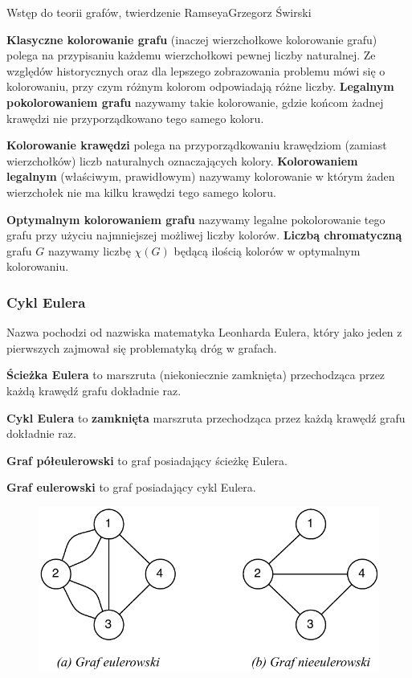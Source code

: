 \begin{referat}{Wstęp do teorii grafów, twierdzenie Ramseya}{Grzegorz Świrski}
\begin{teoria}
\textbf{Klasyczne kolorowanie grafu} (inaczej wierzchołkowe kolorowanie grafu) polega na przypisaniu każdemu wierzchołkowi pewnej liczby naturalnej. Ze względów historycznych oraz dla lepszego zobrazowania problemu mówi się o kolorowaniu, przy czym różnym kolorom odpowiadają różne liczby. \textbf{Legalnym pokolorowaniem grafu} nazywamy takie kolorowanie, gdzie końcom żadnej krawędzi nie przyporządkowano tego samego koloru.

\textbf{Kolorowanie krawędzi} polega na przyporządkowaniu krawędziom (zamiast wierzchołków) liczb naturalnych oznaczających kolory. \textbf{Kolorowaniem legalnym} (właściwym, prawidłowym) nazywamy kolorowanie w którym żaden wierzchołek nie ma kilku krawędzi tego samego koloru.

\textbf{Optymalnym kolorowaniem grafu} nazywamy legalne pokolorowanie tego grafu przy użyciu najmniejszej możliwej liczby kolorów. \textbf{Liczbą chromatyczną} grafu $G$ nazywamy liczbę $\chi(G)$ będącą ilością kolorów w optymalnym kolorowaniu.

\subsubsection{Cykl Eulera}
Nazwa pochodzi od nazwiska matematyka Leonharda Eulera, który jako jeden z pierwszych zajmował się problematyką dróg w grafach. 

\textbf{Ścieżka Eulera} to marszruta (niekoniecznie zamknięta) przechodząca przez każdą krawędź grafu dokładnie raz.

\textbf{Cykl Eulera} to \textbf{zamknięta} marszruta przechodząca przez każdą krawędź grafu dokładnie raz.

\textbf{Graf półeulerowski} to graf posiadający ścieżkę Eulera.

\textbf{Graf eulerowski} to graf posiadający cykl Eulera.

\begin{figure}[h]
  \centering
  \includegraphics[scale=0.65]{./swirski/eulerian_graphs.pdf}
\end{figure}


\end{teoria}
\end{referat}
